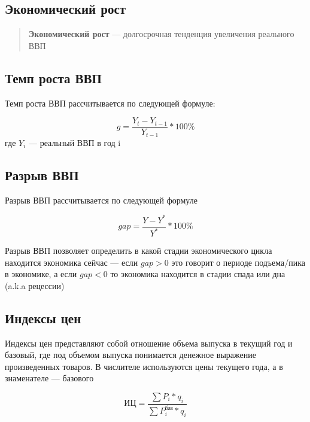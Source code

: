 \documentclass{article}
\begin{document}
    \subsection{Экономический рост}

    \begin{quote}
        \textbf{Экономический рост} --- долгосрочная тенденция увеличения реального ВВП
    \end{quote}

    \subsection{Темп роста ВВП}

    Темп роста ВВП рассчитывается по следующей формуле:

    \begin{equation}
        g = \dfrac{Y_{t} - Y_{t-1}}{Y_{t-1}} * 100\%
    \end{equation}
    где $Y_{i}$ --- реальный ВВП в год i

    \subsection{Разрыв ВВП}

    Разрыв ВВП рассчитывается по следующей формуле

    \begin{equation}
        gap = \dfrac{Y - Y^{*}}{Y^{*}} * 100\%
    \end{equation}

    Разрыв ВВП позволяет определить в какой стадии экономического цикла находится экономика сейчас ---
    если $gap > 0$ это говорит о периоде подъема/пика в экономике, а если $gap < 0$ то экономика находится в стадии
    спада или дна (a.k.a рецессии)

    \subsection{Индексы цен}

    Индексы цен представляют собой отношение объема выпуска в текущий год и базовый, где под объемом выпуска понимается денежное выражение произведенных товаров.
    В числителе используются цены текущего года, а в знаменателе --- базового

    \begin{equation}
        \text{ИЦ} = \dfrac{\sum P_{i} * q_{i}}{\sum P_{i}^{\text{баз}} * q_{i}}
    \end{equation}
\end{document}
